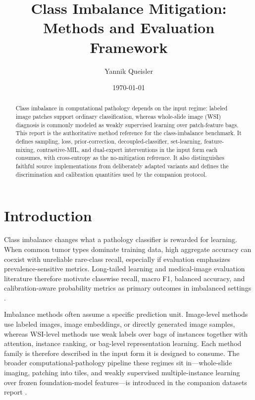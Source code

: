 \documentclass[11pt]{article}
\title{Class Imbalance Mitigation:\\
Methods and Evaluation Framework}
\author{Yannik Queisler}
\date{\today}
\begin{document}
\maketitle

\begin{abstract}
\noindent Class imbalance in computational pathology depends on the input regime: labeled image patches support ordinary classification, whereas whole-slide image (WSI) diagnosis is commonly modeled as weakly supervised learning over patch-feature bags. This report is the authoritative method reference for the class-imbalance benchmark. It defines sampling, loss, prior-correction, decoupled-classifier, set-learning, feature-mixing, contrastive-MIL, and dual-expert interventions in the input form each consumes, with cross-entropy as the no-mitigation reference. It also distinguishes faithful source implementations from deliberately adapted variants and defines the discrimination and calibration quantities used by the companion protocol.
\end{abstract}

\setcounter{tocdepth}{2}
\tableofcontents
\clearpage

\section{Introduction}
Class imbalance changes what a pathology classifier is rewarded for learning. When common tumor types dominate training data, high aggregate accuracy can coexist with unreliable rare-class recall, especially if evaluation emphasizes prevalence-sensitive metrics. Long-tailed learning and medical-image evaluation literature therefore motivate classwise recall, macro F1, balanced accuracy, and calibration-aware probability metrics as primary outcomes in imbalanced settings \citep{saini2023tacklingClass,zhang2023deepLong,mosquera2024classImbalance}.

Imbalance methods often assume a specific prediction unit. Image-level methods use labeled images, image embeddings, or directly generated image samples, whereas WSI-level methods use weak labels over bags of instances together with attention, instance ranking, or bag-level representation learning. Each method family is therefore described in the input form it is designed to consume. The broader computational-pathology pipeline these regimes sit in---whole-slide imaging, patching into tiles, and weakly supervised multiple-instance learning over frozen foundation-model features---is introduced in the companion datasets report \citep{queisler2026datasets}.
\end{document}

